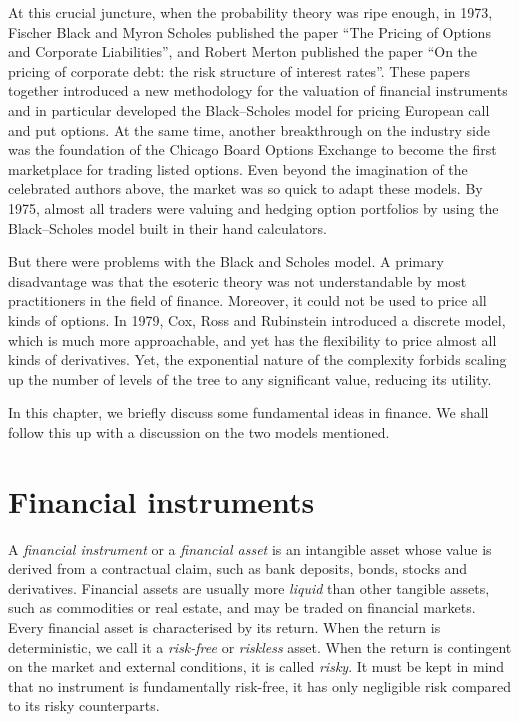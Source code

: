 At this crucial juncture, when the probability theory was ripe enough, in 1973, Fischer Black and Myron Scholes published the paper “The Pricing of Options and Corporate Liabilities”, and Robert Merton published the paper “On the pricing of corporate debt: the risk structure of interest rates”. These papers together introduced a new methodology for the valuation of financial instruments and in particular developed the Black–Scholes model for pricing European call and put options. At the same time, another breakthrough on the industry side was the foundation of the Chicago Board Options Exchange to become the first marketplace for trading listed options. Even beyond the imagination of the celebrated authors above, the market was so quick to adapt these models. By 1975, almost all traders were valuing and hedging option portfolios by using the Black–Scholes model built in their hand calculators.

But there were problems with the Black and Scholes model. A primary disadvantage was that the esoteric theory was not understandable by most practitioners in the field of finance. Moreover, it could not be used to price all kinds of options. In 1979, Cox, Ross and Rubinstein introduced a discrete model, which is much more approachable, and yet has the flexibility to price almost all kinds of derivatives. Yet, the exponential nature of the complexity forbids scaling up the number of levels of the tree to any significant value, reducing its utility.

In this chapter, we briefly discuss some fundamental ideas in finance. We shall follow this up with a discussion on the two models mentioned.


\section{Financial instruments}
\label{sec:intro-assets}

A \emph{financial instrument} or a \emph{financial asset} is an intangible asset whose value is derived from a contractual claim, such as bank deposits, bonds, stocks and derivatives. Financial assets are usually more \emph{liquid} than other tangible assets, such as commodities or real estate, and may be traded on financial markets. Every financial asset is characterised by its return. When the return is deterministic, we call it a \emph{risk-free} or \emph{riskless} asset. When the return is contingent on the market and external conditions, it is called \emph{risky}. It must be kept in mind that no instrument is fundamentally risk-free, it has only negligible risk compared to its risky counterparts.



